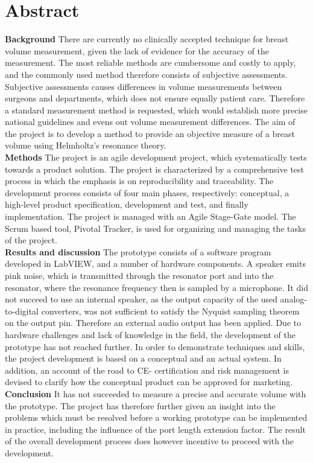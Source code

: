 \section*{Abstract}

\textbf{Background} There are currently no clinically accepted technique for breast volume measurement, given the lack of evidence for the accuracy of the measurement. The most reliable methods are cumbersome and costly to apply, and the commonly used method therefore consists of subjective assessments. Subjective assessments causes differences in volume measurements between surgeons and departments, which does not ensure equally patient care.  Therefore a standard measurement method is requested, which would establish more precise national guidelines and evens out volume measurement differences. The aim of the project is to develop a method to provide an objective measure of a breast volume using Helmholtz's resonance theory.\\
\textbf{Methods} The project is an agile development project, which systematically tests towards a product solution. The project is characterized by a comprehensive test process in which the emphasis is on reproducibility and traceability. The development process consists of four main phases, respectively: conceptual, a high-level product specification, development and test, and finally implementation. The project is managed with an Agile Stage-Gate model. The Scrum based tool, Pivotal Tracker, is used for organizing and managing the tasks of the project. \\
\textbf{Results and discussion} The prototype consists of a software program developed in LabVIEW, and a number of hardware components. A speaker emits pink noise, which is transmitted through the resonator port and into the resonator, where the resonance frequency then is sampled by a microphone. It did not succeed to use an internal speaker, as the output capacity of the used analog-to-digital converters, was not sufficient to satisfy the Nyquist sampling theorem on the output pin. Therefore an external audio output has been applied. Due to hardware challenges and lack of knowledge in the field, the development of the prototype has not reached further. In order to demonstrate techniques and skills, the project development is based on a conceptual and an actual system. In addition, an account of the road to CE- certification and risk management is devised to clarify how the conceptual product can be approved for marketing.\\
\textbf{Conclusion} It has not succeeded to measure a precise and accurate volume with the prototype. The project has therefore further given an insight into the problems which must be resolved before a working prototype can be implemented in practice, including the influence of the port length extension factor. The result of the overall development process does however incentive to proceed with the development.
    